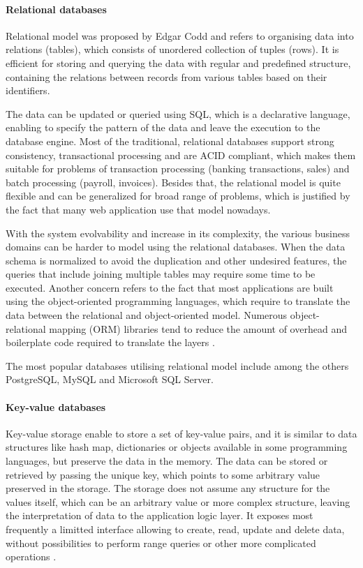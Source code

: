 \paragraph{Relational databases}

Relational model was proposed by Edgar Codd and refers to organising data into relations (tables), which consists of unordered collection of tuples (rows). It is efficient for storing and querying the data with regular and predefined structure, containing the relations between records from various tables based on their identifiers.

The data can be updated or queried using SQL, which is a declarative language, enabling to specify the pattern of the data and leave the execution to the database engine. Most of the traditional, relational databases support strong consistency, transactional processing and are ACID compliant, which makes them suitable for problems of transaction processing (banking transactions, sales) and batch processing (payroll, invoices). Besides that, the relational model is quite flexible and can be generalized for broad range of problems, which is justified by the fact that many web application use that model nowadays.

With the system evolvability and increase in its complexity, the various business domains can be harder to model using the relational databases. When the data schema is normalized to avoid the duplication and other undesired features, the queries that include joining multiple tables may require some time to be executed. Another concern refers to the fact that most applications are built using the object-oriented programming languages, which require to translate the data between the relational and object-oriented model. Numerous object-relational mapping (ORM) libraries tend to reduce the amount of overhead and boilerplate code required to translate the layers \cite{DesignDataIntensiveApplications}.

The most popular databases utilising relational model include among the others PostgreSQL, MySQL and Microsoft SQL Server.

\paragraph{Key-value databases}

Key-value storage enable to store a set of key-value pairs, and it is similar to data structures like hash map, dictionaries or objects available in some programming languages, but preserve the data in the memory. The data can be stored or retrieved by passing the unique key, which points to some arbitrary value preserved in the storage.
The storage does not assume any structure for the values itself, which can be an arbitrary value or more complex structure, leaving the interpretation of data to the application logic layer.
It exposes most frequently a limitted interface allowing to create, read, update and delete data, without possibilities to perform range queries or other more complicated operations \cite{NoSQLDatabaseSystemsSurveyDecisionGuidance}.

